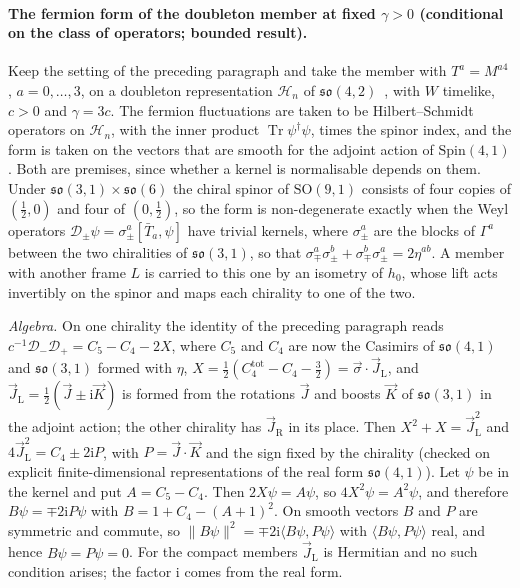 \paragraph{The fermion form of the doubleton member at fixed \(\gamma>0\) (conditional on the class of operators; bounded result).}
Keep the setting of the preceding paragraph and take the member with \(T^a=M^{a4}\), \(a=0,\dots,3\), on a doubleton representation \(\mathcal H_n\) of \(\mathfrak{so}(4,2)\)~\cite{MantaSteinacker2025}, with \(W\) timelike, \(c>0\) and \(\gamma=3c\). The fermion fluctuations are taken to be Hilbert--Schmidt operators on \(\mathcal H_n\), with the inner product \(\operatorname{Tr}\psi^\dagger\psi\), times the spinor index, and the form is taken on the vectors that are smooth for the adjoint action of \(\mathrm{Spin}(4,1)\). Both are premises, since whether a kernel is normalisable depends on them. Under \(\mathfrak{so}(3,1)\times\mathfrak{so}(6)\) the chiral spinor of \(\mathrm{SO}(9,1)\) consists of four copies of \((\tfrac12,0)\) and four of \((0,\tfrac12)\), so the form is non-degenerate exactly when the Weyl operators \(\mathcal D_\pm\psi=\sigma_\pm^a[\bar T_a,\psi]\) have trivial kernels, where \(\sigma_\pm^a\) are the blocks of \(\Gamma^a\) between the two chiralities of \(\mathfrak{so}(3,1)\), so that \(\sigma_\mp^a\sigma_\pm^b+\sigma_\mp^b\sigma_\pm^a=2\eta^{ab}\). A member with another frame \(L\) is carried to this one by an isometry of \(h_0\), whose lift acts invertibly on the spinor and maps each chirality to one of the two.

\emph{Algebra.} On one chirality the identity of the preceding paragraph reads \(c^{-1}\mathcal D_-\mathcal D_+=C_5-C_4-2X\), where \(C_5\) and \(C_4\) are now the Casimirs of \(\mathfrak{so}(4,1)\) and \(\mathfrak{so}(3,1)\) formed with \(\eta\), \(X=\tfrac12(C_4^{\mathrm{tot}}-C_4-\tfrac32)=\vec\sigma\cdot\vec J_{\mathrm L}\), and \(\vec J_{\mathrm L}=\tfrac12(\vec J\pm\mathrm i\vec K)\) is formed from the rotations \(\vec J\) and boosts \(\vec K\) of \(\mathfrak{so}(3,1)\) in the adjoint action; the other chirality has \(\vec J_{\mathrm R}\) in its place. Then \(X^2+X=\vec J_{\mathrm L}^2\) and \(4\vec J_{\mathrm L}^2=C_4\pm2\mathrm iP\), with \(P=\vec J\cdot\vec K\) and the sign fixed by the chirality (checked on explicit finite-dimensional representations of the real form \(\mathfrak{so}(4,1)\)). Let \(\psi\) be in the kernel and put \(A=C_5-C_4\). Then \(2X\psi=A\psi\), so \(4X^2\psi=A^2\psi\), and therefore \(B\psi=\mp2\mathrm iP\psi\) with \(B=1+C_4-(A+1)^2\). On smooth vectors \(B\) and \(P\) are symmetric and commute, so \(\|B\psi\|^2=\mp2\mathrm i\langle B\psi,P\psi\rangle\) with \(\langle B\psi,P\psi\rangle\) real, and hence \(B\psi=P\psi=0\). For the compact members \(\vec J_{\mathrm L}\) is Hermitian and no such condition arises; the factor \(\mathrm i\) comes from the real form.

